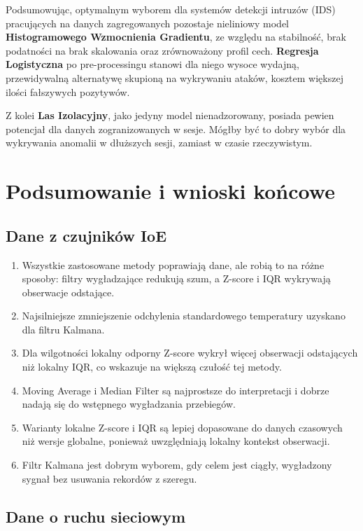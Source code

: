 \documentclass[12pt,twoside]{article}
\begin{document}
Podsumowując, optymalnym wyborem dla systemów detekcji intruzów (IDS) pracujących na danych zagregowanych pozostaje nieliniowy model \textbf{Histogramowego Wzmocnienia Gradientu}, ze względu na stabilność, brak podatności na brak skalowania oraz zrównoważony profil cech. 
\textbf{Regresja Logistyczna} po pre-processingu stanowi dla niego wysoce wydajną, przewidywalną alternatywę skupioną na wykrywaniu ataków, kosztem większej ilości fałszywych pozytywów. 

Z kolei \textbf{Las Izolacyjny}, jako jedyny model nienadzorowany, posiada pewien potencjał dla danych zogranizowanych w sesje.
Mógłby być to dobry wybór dla wykrywania anomalii w dłuższych sesji, zamiast w czasie rzeczywistym.

\section{Podsumowanie i wnioski końcowe}

\subsection{Dane z czujników IoE}

\begin{enumerate}


\item Wszystkie zastosowane metody poprawiają dane, ale robią to na różne sposoby: filtry wygładzające redukują szum, a Z-score i IQR wykrywają obserwacje odstające.
\item Najsilniejsze zmniejszenie odchylenia standardowego temperatury uzyskano dla filtru Kalmana.
\item Dla wilgotności lokalny odporny Z-score wykrył więcej obserwacji odstających niż lokalny IQR, co wskazuje na większą czułość tej metody.
\item Moving Average i Median Filter są najprostsze do interpretacji i dobrze nadają się do wstępnego wygładzania przebiegów.
\item Warianty lokalne Z-score i IQR są lepiej dopasowane do danych czasowych niż wersje globalne, ponieważ uwzględniają lokalny kontekst obserwacji.
\item Filtr Kalmana jest dobrym wyborem, gdy celem jest ciągły, wygładzony sygnał bez usuwania rekordów z szeregu.
\end{enumerate}

\subsection{Dane o ruchu sieciowym}
\end{document}
